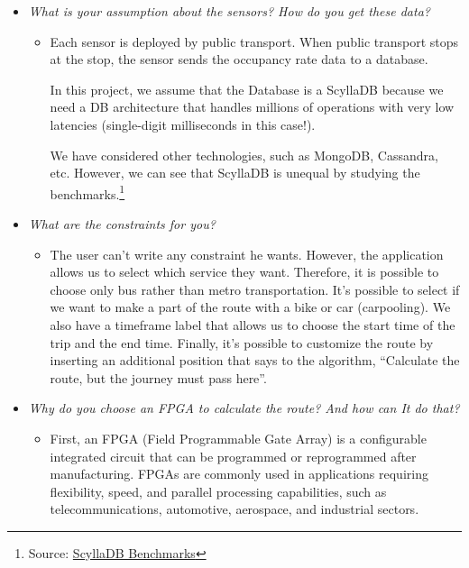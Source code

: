 \documentclass[a4paper]{article}
\newcommand{\dquotes}[1]{``#1''}
\begin{document}
\begin{itemize}[label=]
        \item \emph{What is your assumption about the sensors? How do you get these data?}
        \begin{itemize}[label=]
            \item Each sensor is deployed by public transport. When public transport stops at the stop, the sensor sends the occupancy rate data to a database.
            
            In this project, we assume that the Database is a ScyllaDB because we need a DB architecture that handles millions of operations with very low latencies (single-digit milliseconds in this case!).
            
            We have considered other technologies, such as MongoDB, Cassandra, etc. However, we can see that ScyllaDB is unequal by studying the benchmarks.\footnote{Source: \href{https://www.scylladb.com/product/benchmarks/}{ScyllaDB Benchmarks}}
        \end{itemize}
        
        \item \emph{What are the constraints for you?}
        \begin{itemize}[label=]
            \item The user can't write any constraint he wants. However, the application allows us to select which service they want. Therefore, it is possible to choose only bus rather than metro transportation. It's possible to select if we want to make a part of the route with a bike or car (carpooling). We also have a timeframe label that allows us to choose the start time of the trip and the end time. Finally, it's possible to customize the route by inserting an additional position that says to the algorithm, \dquotes{Calculate the route, but the journey must pass here}.
        \end{itemize}

        \item \emph{Why do you choose an FPGA to calculate the route? And how can It do that?}
        \begin{itemize}[label=]
            \item First, an FPGA (Field Programmable Gate Array) is a configurable integrated circuit that can be programmed or reprogrammed after manufacturing. FPGAs are commonly used in applications requiring flexibility, speed, and parallel processing capabilities, such as telecommunications, automotive, aerospace, and industrial sectors.
            

\end{itemize}
\end{itemize}
\end{document}
